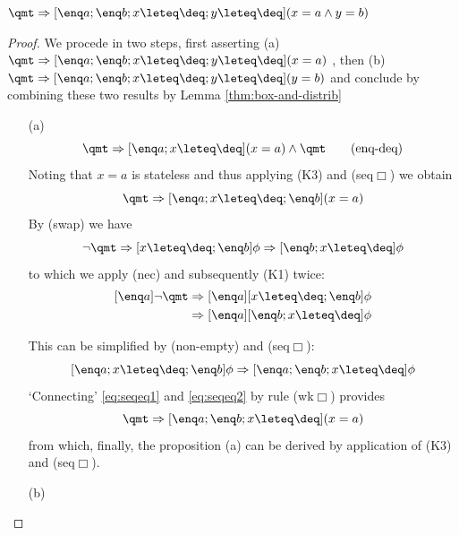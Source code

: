 \begin{prop}
 $\qmt \Rightarrow [\enq a; \enq b; x \leteq \deq; y \leteq \deq](x=a \land y=b)$
\end{prop}

\begin{proof}
  We procede in two steps, first asserting (a) $\qmt \Rightarrow [\enq a; \enq b; x \leteq
  \deq; y \leteq \deq](x=a)$ , then (b) $\qmt \Rightarrow [\enq a; \enq b; x \leteq \deq;
  y \leteq \deq](y=b)$ and conclude by combining these two results by Lemma
  \ref{thm:box-and-distrib}

\begin{itemize}
\item[(a)]
\[
\qmt \Rightarrow [\enq a; x\leteq \deq](x=a) \land \qmt \tag{enq-deq}
\]
Noting that $x=a$ is stateless and thus applying (K3) and (seq$\Box$) we
obtain
\begin{equation}
\label{eq:seqeq1}
\qmt \Rightarrow [\enq a; x\leteq\deq; \enq b](x=a)
\end{equation}
By (swap) we have
\[
\lnot \qmt \Rightarrow [x\leteq \deq; \enq b]\phi \Rightarrow [\enq b; x\leteq\deq]\phi
\]
to which we apply (nec) and subsequently (K1) twice:
\[ \begin{split}
  [\enq a]\lnot \qmt \Rightarrow 
   [\enq a][x\leteq \deq; \enq b]\phi \\
  \Rightarrow [\enq a][\enq b; x\leteq \deq]\phi
\end{split} \]

This can be simplified by (non-empty) and (seq$\Box$):
\begin{equation}
\label{eq:seqeq2}
[\enq a; x\leteq \deq; \enq b]\phi \Rightarrow [\enq a; \enq b; x\leteq \deq]\phi
\end{equation}
`Connecting' \eqref{eq:seqeq1} and \eqref{eq:seqeq2} by rule (wk$\Box$) provides
\[\qmt \Rightarrow [\enq a; \enq b; x\leteq \deq](x=a)\]
from which, finally, the proposition (a) can be derived by application of (K3)
and (seq$\Box$).

\item[(b)]


\end{itemize}
\end{proof}
